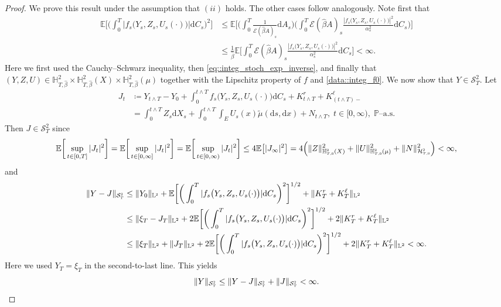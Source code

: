 \documentclass[10pt]{article} %
\newcommand\cE{\mathcal E}
\newcommand\cH{\mathcal H}
\newcommand\cS{\mathcal S}
\newcommand{\smalltext}[1]{\text{\fontsize{4}{4}\selectfont$#1$}}
\def \E{\mathbb{E}}
\def \H{\mathbb{H}}
\def \L{\mathbb{L}}
\def \P{\mathbb{P}}
\newcommand{\1}{\mathbf{1}}
\def\d{\mathrm{d}}
\begin{document}
\begin{proof}
	We prove this result under the assumption that $(ii)$ holds. The other cases follow analogously. Note first that 
	\begin{align*}
		\E\bigg[\bigg(\int_0^T |f_s\big(Y_s,Z_s,U_s(\cdot)\big)| \d C_s\bigg)^2\bigg] 
		&\leq \E\bigg[\bigg(\int_0^T\frac{1}{\cE(\hat\beta A)_{s}}\d A_s\bigg)\bigg(\int_0^T \cE(\hat\beta A)_{s}\frac{|f_s\big(Y_s,Z_s,U_s(\cdot)\big)|^2}{\alpha^2_s} \d C_s\bigg)\bigg] \\
		&\leq  \frac{1}{\hat\beta}\E\bigg[\int_0^T \cE(\hat\beta A)_{s}\frac{|f_s\big(Y_s,Z_s,U_s(\cdot)\big)|^2}{\alpha^2_s} \d C_s\bigg] < \infty.
	\end{align*}
	Here we first used the Cauchy--Schwarz inequality, then \eqref{eq::integ_stoch_exp_inverse}, and finally that $(Y,Z,U) \in \H^2_{T,\hat\beta} \times \H^2_{T,\hat\beta}(X) \times \H^2_{T,\hat\beta}(\mu)$ together with the Lipschitz property of $f$ and \ref{data::integ_f0}. We now show that $Y \in \cS^2_T$. Let
	\begin{align*}
		J_t 
		&\coloneqq Y_{t \land T} - Y_0 + \int_0^{t \land T} f_s\big(Y_s,Z_s,U_s(\cdot)\big)\d C_s + K^r_{t \land T} + K^\ell_{(t \land T)-} \\
		&= \int_0^{t \land T} Z_s \d X_s + \int_0^{t \land T}\int_E U_s(x)\tilde\mu(\d s, \d x) + N_{t \land T}, \; t \in [0,\infty), \; \text{$\P$--a.s.}
	\end{align*}
	Then $J \in \cS^2_T$ since
	\begin{equation*}
		\E\bigg[\sup_{t \in [0,T]}|J_t|^2\bigg] = \E\bigg[\sup_{t \in [0,\infty]}|J_t|^2\bigg] = \E\bigg[\sup_{t \in [0,\infty)}|J_t|^2\bigg] 
		\leq 4 \E\big[|J_\infty|^2\big] 
		= 4\Big(\|Z\|^2_{\H^\smalltext{2}_{\smalltext{T}\smalltext{,}\smalltext{0}}(X)} + \|U\|^2_{\H^\smalltext{2}_{\smalltext{T}\smalltext{,}\smalltext{0}}(\mu)} + \|N\|^2_{\cH^\smalltext{2}_{\smalltext{T}\smalltext{,}\smalltext{0}}}\Big) < \infty,
	\end{equation*}
	and
	\begin{align*}
		\|Y - J\|_{\cS^\smalltext{2}_\smalltext{T}} 
		&\leq \|Y_0\|_{\L^\smalltext{2}} + \E\bigg[\bigg(\int_0^T |f_s\big(Y_s,Z_s,U_s(\cdot)\big)| \d C_s\bigg)^2\bigg]^{1/2} + \|K^r_T + K^\ell_T\|_{\L^2} \\
		&\leq \|\xi_T - J_T\|_{\L^2} + 2 \E\bigg[\bigg(\int_0^T |f_s\big(Y_s,Z_s,U_s(\cdot)\big)| \d C_s\bigg)^2\bigg]^{1/2} + 2 \|K^r_T + K^\ell_T\|_{\L^2} \\
		&\leq \|\xi_T\|_{\L^2} + \|J_T\|_{\L^2} + 2 \E\bigg[\bigg(\int_0^T |f_s\big(Y_s,Z_s,U_s(\cdot)\big)| \d C_s\bigg)^2\bigg]^{1/2} + 2 \|K^r_T + K^\ell_T\|_{\L^2} < \infty.
	\end{align*}
	Here we used $Y_T = \xi_T$ in the second-to-last line. This yields
	\begin{equation*}
		\|Y\|_{\cS^\smalltext{2}_\smalltext{T}} \leq \|Y - J\|_{\cS^\smalltext{2}_\smalltext{T}} + \|J\|_{\cS^\smalltext{2}_\smalltext{T}} < \infty.
	\end{equation*}
	


\end{proof}
\end{document}
